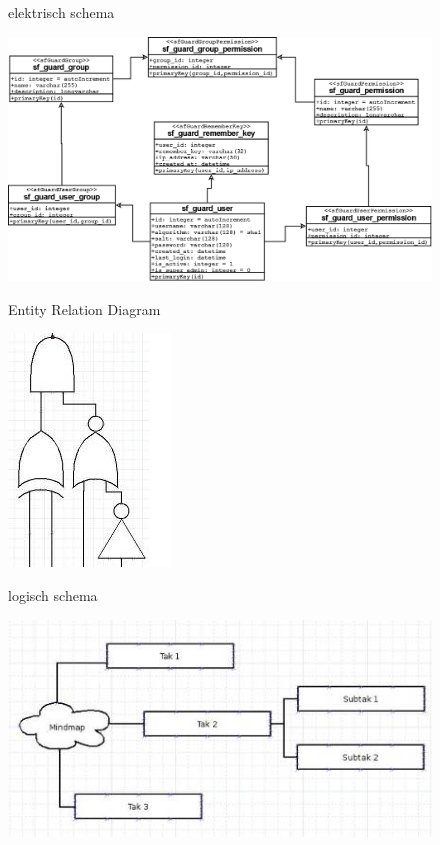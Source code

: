 \documentclass[12pt,a4paper]{report}
\begin{document}
\begin{flushleft}
\begin{figure}[H]
\label{voorbeeldschema_elektrisch}
\centering 
\vspace{-10pt}
\caption{elektrisch schema}
\end{figure}
\begin{figure}[H]
\includegraphics[scale=0.25]{images/voorbeeldschema_ERD.png}
\label{voorbeeldschema_ERD}
\centering 
\vspace{-10pt}
\caption{Entity Relation Diagram}
\end{figure}
\begin{figure}[H]
\includegraphics[scale=1]{images/voorbeeldschema_logisch.png}
\label{voorbeeldschema_logisch}
\centering 
\vspace{-10pt}
\caption{logisch schema}
\end{figure}
\begin{figure}[H]
\includegraphics[scale=1]{images/voorbeeldschema_mindmap.png}

\end{figure}
\end{flushleft}
\end{document}
